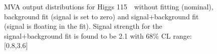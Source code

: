 \begin{figure}[!hbtp]
\caption{
MVA output distributions for Higgs 115~\GeV\ without fitting
(nominal), background fit (signal is set to zero) and
signal+background fit (signal is floating in the fit). Signal strength
for the signal+background fit is found to be 2.1 with 68\% CL range:
[0.8,3.6] }
\label{fig:fit_115}
\end{figure}

